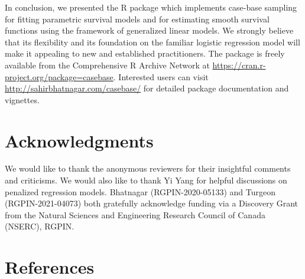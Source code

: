 In conclusion, we presented the R package  which implements case-base sampling for fitting parametric survival models and for estimating smooth survival functions using the framework of generalized linear models. We strongly believe that its flexibility and its foundation on the familiar logistic regression model will make it appealing to new and established practitioners. The  package is freely available from the Comprehensive R Archive Network at \url{https://cran.r-project.org/package=casebase}. Interested users can visit \url{http://sahirbhatnagar.com/casebase/} for detailed package documentation and vignettes.

\hypertarget{acknowledgments}{%
\section{Acknowledgments}\label{acknowledgments}}

We would like to thank the anonymous reviewers for their insightful comments and criticisms. We would also like to thank Yi Yang for helpful discussions on penalized regression models. Bhatnagar (RGPIN-2020-05133) and Turgeon (RGPIN-2021-04073) both gratefully acknowledge funding via a Discovery Grant from the Natural Sciences and Engineering Research Council of Canada (NSERC), RGPIN.

\hypertarget{references}{%
\section*{References}\label{references}}

